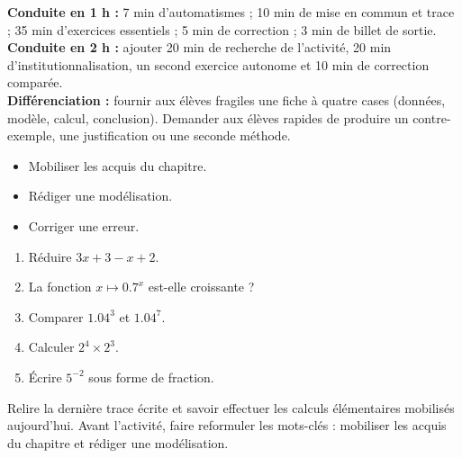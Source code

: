 \ifmxteacher
\begin{method}
\textbf{Conduite en 1 h :} 7 min d'automatismes ; 10 min de mise en commun et trace ; 35 min d'exercices essentiels ; 5 min de correction ; 3 min de billet de sortie.\\
\textbf{Conduite en 2 h :} ajouter 20 min de recherche de l'activité, 20 min d'institutionnalisation, un second exercice autonome et 10 min de correction comparée.\\
\textbf{Différenciation :} fournir aux élèves fragiles une fiche à quatre cases (données, modèle, calcul, conclusion). Demander aux élèves rapides de produire un contre-exemple, une justification ou une seconde méthode.
\end{method}
\fi
{}
\begin{objectives}\begin{itemize}\item Mobiliser les acquis du chapitre.\item Rédiger une modélisation.\item Corriger une erreur.\end{itemize}\end{objectives}
\begin{fluency}\begin{enumerate}\item Réduire $3x+3-x+2$. \item La fonction $x\mapsto\num{0,7}^x$ est-elle croissante ? \item Comparer $\num{1,04}^3$ et $\num{1,04}^7$. \item Calculer $2^4\times2^3$. \item Écrire $5^{-2}$ sous forme de fraction. \end{enumerate}\end{fluency}
\begin{prerequisites}Relire la dernière trace écrite et savoir effectuer les calculs élémentaires mobilisés aujourd'hui. Avant l'activité, faire reformuler les mots-clés : mobiliser les acquis du chapitre et rédiger une modélisation.\end{prerequisites}

